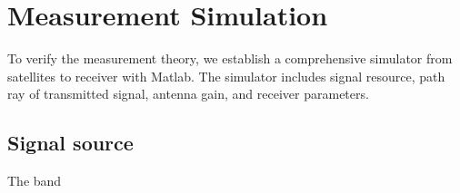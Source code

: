 \section{Measurement Simulation}

To verify the measurement theory, we establish a comprehensive simulator from  satellites to receiver with Matlab. The simulator includes signal resource, path ray of transmitted signal, antenna gain, and receiver parameters.

\subsection{Signal source}
The band